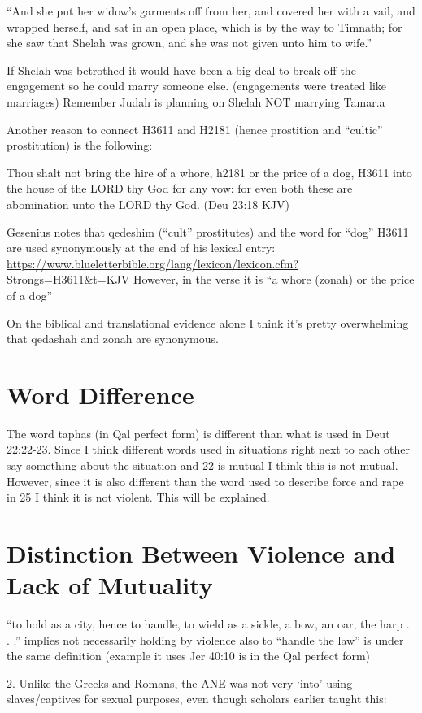 \documentclass[11pt]{article}
\begin{document}
“And she put her widow’s garments off from her, and covered her with a vail, and wrapped herself, and sat in an open place, which is by the way to Timnath; for she saw that Shelah was grown, and she was not given unto him to wife.”

If Shelah was betrothed it would have been a big deal to break off the engagement so he could marry someone else. (engagements were treated like marriages) Remember Judah is planning on Shelah NOT marrying Tamar.a

Another reason to connect H3611 and H2181 (hence prostition and “cultic” prostitution) is the following:

Thou shalt not bring the hire of a whore, h2181 or the price of a dog, H3611 into the house of the LORD thy God for any vow: for even both these are abomination unto the LORD thy God. (Deu 23:18 KJV)

Gesenius notes that qedeshim (“cult” prostitutes) and the word for “dog” H3611 are used synonymously at the end of his lexical entry: \url{https://www.blueletterbible.org/lang/lexicon/lexicon.cfm?Strongs=H3611&t=KJV} However, in the verse it is “a whore (zonah) or the price of a dog”

On the biblical and translational evidence alone I think it’s pretty overwhelming that qedashah and zonah are synonymous.


\section{Word Difference}

The word taphas (in Qal perfect form) is different than what is used in Deut 22:22-23. Since I think different words used in situations right next to each other say something about the situation and 22 is mutual I think this is not mutual. However, since it is also different than the word used to describe force and rape in 25 I think it is not violent. This will be explained.

\section{Distinction Between Violence and Lack of Mutuality}
“to hold as a city, hence to handle, to wield as a sickle, a bow, an oar, the harp . . .” implies not necessarily holding by violence also to “handle the law” is under the same definition (example it uses Jer 40:10 is in the Qal perfect form)


2. Unlike the Greeks and Romans, the ANE was not very ‘into’ using slaves/captives for sexual purposes, even though scholars earlier taught this:
\end{document}

